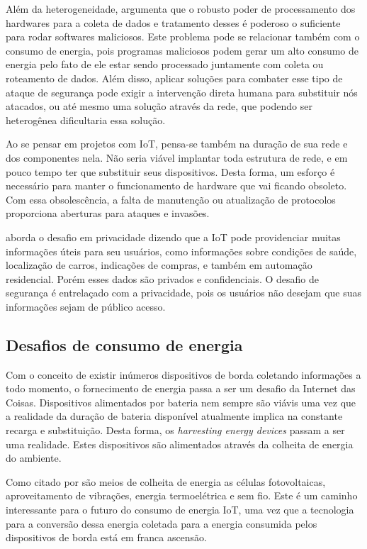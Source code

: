 \documentclass[
    hidelinks,
	12pt,				%
	openany,
	oneside, 
	a4paper,			%
	english,			%
	french,				%
	spanish,			%
	brazil				%
	]{abntex2}
\begin{document}
Além da heterogeneidade, \cite{ray2016introIoT} argumenta que o robusto poder de processamento dos hardwares para a coleta de dados e tratamento desses é poderoso o suficiente para rodar softwares maliciosos. Este problema pode se relacionar também com o consumo de energia, pois programas maliciosos podem gerar um alto consumo de energia pelo fato de ele estar sendo processado juntamente com coleta ou roteamento de dados. Além disso, aplicar soluções para combater esse tipo de ataque de segurança pode exigir a intervenção direta humana para substituir nós atacados, ou até mesmo uma solução através da rede, que podendo ser heterogênea dificultaria essa solução.

Ao se pensar em projetos com IoT, pensa-se também na duração de sua rede e dos componentes nela. Não seria viável implantar toda estrutura de rede, e em pouco tempo ter que substituir seus dispositivos. Desta forma, um esforço é necessário para manter o funcionamento de hardware que vai ficando obsoleto. Com essa obsolescência, a falta de manutenção ou atualização de protocolos proporciona aberturas para ataques e invasões. 

\cite{LEE2015431IoTApplicandChallenges} aborda o desafio em privacidade dizendo que a IoT pode providenciar muitas informações úteis para seu usuários, como informações sobre condições de saúde, localização de carros, indicações de compras, e também em automação residencial. Porém esses dados são privados e confidenciais. O desafio de segurança é entrelaçado com a privacidade, pois os usuários não desejam que suas informações sejam de público acesso.

\subsection{Desafios de consumo de energia}

Com o conceito de existir inúmeros dispositivos de borda coletando informações a todo momento, o fornecimento de energia passa a ser um desafio da Internet das Coisas. Dispositivos alimentados por bateria nem sempre são viávis uma vez que a realidade da duração de bateria disponível atualmente implica na constante recarga e substituição. Desta forma, os \textit{harvesting energy devices} passam a ser uma realidade. Estes dispositivos são alimentados através da colheita de energia do ambiente. 

Como citado por \cite{ray2016introIoT} são meios de colheita de energia as células fotovoltaicas, aproveitamento de vibrações, energia termoelétrica e sem fio. Este é um caminho interessante para o futuro do consumo de energia IoT, uma vez que a tecnologia para a conversão dessa energia coletada para a energia consumida pelos dispositivos de borda está em franca ascensão. 
\end{document}
